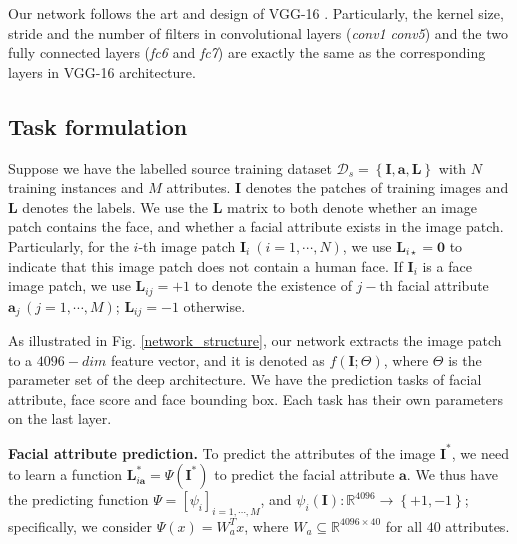 \documentclass[10pt,twocolumn,letterpaper]{article}
\begin{document}
Our network follows the art and design of VGG-16 \cite{returnDevil2014BMVC}.
Particularly, the kernel size, stride and the number of filters in
convolutional layers (\emph{conv1}\textendash{} \emph{conv5}) and
the two fully connected layers (\emph{fc6} and \emph{fc7}) are exactly
the same as the corresponding layers in VGG-16 architecture.

\subsection{Task formulation\label{subsec:Task-formulation}}

Suppose we have the labelled source training dataset $\mathcal{D}_{s}=\left\{ \mathbf{I},\mathbf{a},\mathbf{L}\right\} $
with $N$ training instances and $M$ attributes. $\mathbf{I}$ denotes
the patches of training images and $\mathbf{L}$ denotes the labels. We use the $\mathbf{L}$ matrix to
both denote whether an image patch contains the face, and whether
a facial attribute exists in the image patch. Particularly, for the
$i$-th image patch $\mathbf{I}_{i}\:(i=1,\cdots,N)$, we use $\mathbf{L}_{i\star}=\mathbf{0}$
to indicate that this image patch does not contain a human face. If
$\mathbf{I}_{i}$ is a face image patch, we use $\mathbf{L}_{ij}=+1$
to denote the existence of $j-$th facial attribute $\mathbf{a}_{j}\,(j=1,\cdots,M)$;
$\mathbf{L}_{ij}=-1$ otherwise. 

As illustrated in Fig. \ref{network_structure}, our network extracts
the image patch to a $4096-dim$ feature vector, and it is denoted
as $f\left(\mathbf{I};\Theta\right)$, where $\Theta$ is the parameter
set of the deep architecture. We have the prediction tasks of facial
attribute, face score and face bounding box. Each task has their own
parameters on the last layer.

\vspace{0.05in}

\noindent \textbf{Facial attribute prediction.} To predict the attributes
of the image $\mathbf{I}^{*}$, we need to learn a function $\mathbf{L}_{i\mathbf{a}}^{*}=\Psi\left(\mathbf{I}^{*}\right)$
to predict the facial attribute $\mathbf{a}$. We thus have the predicting
function $\Psi=\left[\psi_{i}\right]_{i=1,\cdots,M}$, and $\psi_{i}\left(\mathbf{I}\right):\mathbb{R}^{4096}\rightarrow\left\{ +1,-1\right\} $;
specifically, we consider $\Psi\left(x\right)=W_{a}^{T}x$, where
$W_{a}\subseteq\mathbb{R}^{4096\times40}$ for all $40$ attributes.

\vspace{0.05in}
\end{document}
